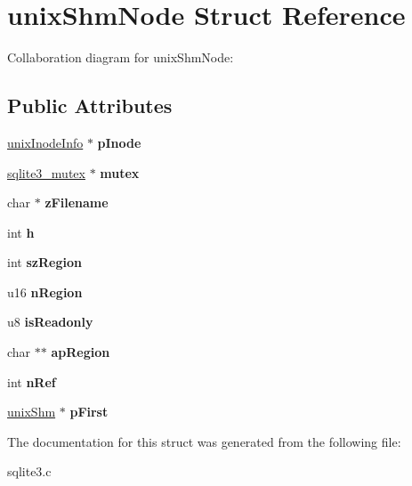 \hypertarget{structunixShmNode}{}\section{unix\+Shm\+Node Struct Reference}
\label{structunixShmNode}


Collaboration diagram for unix\+Shm\+Node\+:
\subsection*{Public Attributes}
\begin{DoxyCompactItemize}
\item 
\hyperlink{structunixInodeInfo}{unix\+Inode\+Info} $\ast$ {\bfseries p\+Inode}\hypertarget{structunixShmNode_ab6bc1cf84d65887a3395da6406843817}{}\label{structunixShmNode_ab6bc1cf84d65887a3395da6406843817}

\item 
\hyperlink{structsqlite3__mutex}{sqlite3\+\_\+mutex} $\ast$ {\bfseries mutex}\hypertarget{structunixShmNode_aa90850530f48fec6f2a872874f8ddf1f}{}\label{structunixShmNode_aa90850530f48fec6f2a872874f8ddf1f}

\item 
char $\ast$ {\bfseries z\+Filename}\hypertarget{structunixShmNode_a188c3bc5fcb4666ad0817ac093e7505d}{}\label{structunixShmNode_a188c3bc5fcb4666ad0817ac093e7505d}

\item 
int {\bfseries h}\hypertarget{structunixShmNode_a9cd93c8052eb47f257e2d752e8f1fdba}{}\label{structunixShmNode_a9cd93c8052eb47f257e2d752e8f1fdba}

\item 
int {\bfseries sz\+Region}\hypertarget{structunixShmNode_ae8126f9db70a758c2f340ec06869e02b}{}\label{structunixShmNode_ae8126f9db70a758c2f340ec06869e02b}

\item 
u16 {\bfseries n\+Region}\hypertarget{structunixShmNode_aaf1fceb640b3959424403885c0419a46}{}\label{structunixShmNode_aaf1fceb640b3959424403885c0419a46}

\item 
u8 {\bfseries is\+Readonly}\hypertarget{structunixShmNode_ad241b0a85f01110310cea91aa38fccb2}{}\label{structunixShmNode_ad241b0a85f01110310cea91aa38fccb2}

\item 
char $\ast$$\ast$ {\bfseries ap\+Region}\hypertarget{structunixShmNode_a8eff550f9b10a2de463e9874f84efc5e}{}\label{structunixShmNode_a8eff550f9b10a2de463e9874f84efc5e}

\item 
int {\bfseries n\+Ref}\hypertarget{structunixShmNode_a6d9f0c9dec3f6710cb09c90723a8284b}{}\label{structunixShmNode_a6d9f0c9dec3f6710cb09c90723a8284b}

\item 
\hyperlink{structunixShm}{unix\+Shm} $\ast$ {\bfseries p\+First}\hypertarget{structunixShmNode_a0ddd6c4625acf5994a60b0c368bc665e}{}\label{structunixShmNode_a0ddd6c4625acf5994a60b0c368bc665e}

\end{DoxyCompactItemize}


The documentation for this struct was generated from the following file\+:\begin{DoxyCompactItemize}
\item 
sqlite3.\+c\end{DoxyCompactItemize}
